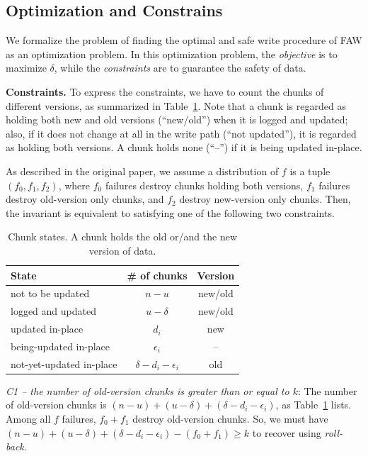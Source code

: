 \documentclass[letterpaper,10pt,twocolumn]{article}
\def\protocol/{FAW}
\begin{document}
\subsection{Optimization and Constrains}

We formalize the problem of finding the optimal and safe write procedure of \protocol/ as an optimization problem. 
In this optimization problem, the \emph{objective} is to maximize $\delta$, while the \emph{constraints} are to guarantee the safety of data.

\noindent
\textbf{Constraints.} To express the constraints, we have to count the chunks of different versions, as summarized in Table~\ref{tab:states}.
Note that a chunk is regarded as holding both new and old versions (``new/old'') when it is logged and updated; also, if it does not change at all in the write
path (``not updated''), it is regarded as holding both versions. A chunk
holds none (``--'') if it is being updated in-place.

As described in the original paper, we assume a distribution of $f$ is a tuple $(f_0, f_1, f_2)$, where $f_0$ failures destroy
chunks holding both versions, $f_1$ failures destroy old-version only chunks,
and $f_2$ destroy new-version only chunks. Then, the invariant is equivalent to
satisfying one of the following two constraints.

\begin{table}[!b]
\centering
\begin{tabular}{l|c|c}
\hline
State & \# of chunks & Version \\
\hline
not to be updated & $n - u$ & new/old \\
logged and updated & $u - \delta$ & new/old \\
updated in-place & $d_i$ & new \\
being-updated in-place & $\epsilon_i$ & -- \\
not-yet-updated in-place & $\delta - d_i - \epsilon_i$ & old \\
\hline
\end{tabular}
\caption{Chunk states. A chunk holds the old or/and the new version of data.  }
\label{tab:states}
\end{table}

\emph{C1 -- the number of old-version chunks is greater than or equal to $k$}: The number of old-version chunks is $(n -
u) + (u - \delta) + (\delta - d_i - \epsilon_i)$, as Table~\ref{tab:states}
lists. Among all $f$ failures, $f_0 + f_1$ destroy old-version chunks.
So, we must have $(n - u) + (u - \delta) + (\delta -
d_i - \epsilon_i) - (f_0 + f_1) \ge k$ to recover using \emph{roll-back}.
\end{document}
